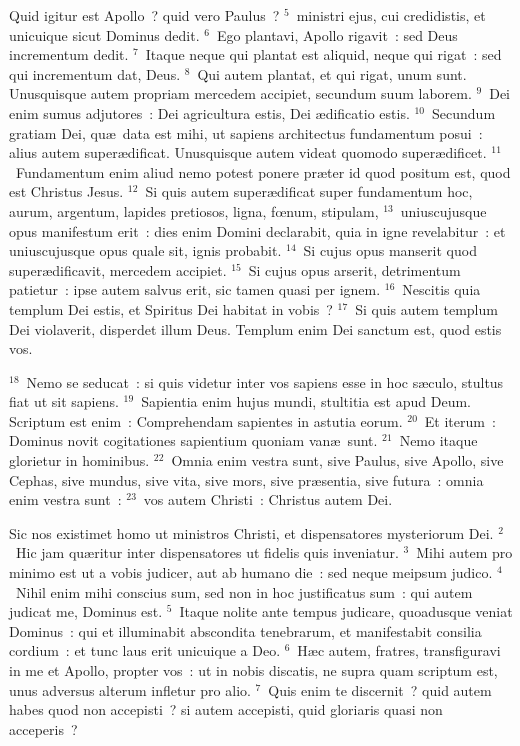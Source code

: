  Quid igitur est Apollo~? quid vero Paulus~?
${}^{5}$~ministri ejus, cui credidistis, et unicuique sicut Dominus dedit.
${}^{6}$~Ego plantavi, Apollo rigavit~: sed Deus incrementum dedit.
${}^{7}$~Itaque neque qui plantat est aliquid, neque qui rigat~: sed qui incrementum dat, Deus.
${}^{8}$~Qui autem plantat, et qui rigat, unum sunt. Unusquisque autem propriam mercedem accipiet, secundum suum laborem.
${}^{9}$~Dei enim sumus adjutores~: Dei agricultura estis, Dei \ae dificatio estis.
${}^{10}$~Secundum gratiam Dei, qu\ae\ data est mihi, ut sapiens architectus fundamentum posui~: alius autem super\ae dificat. Unusquisque autem videat quomodo super\ae dificet.
${}^{11}$~Fundamentum enim aliud nemo potest ponere pr\ae ter id quod positum est, quod est Christus Jesus.
${}^{12}$~Si quis autem super\ae dificat super fundamentum hoc, aurum, argentum, lapides pretiosos, ligna, fœnum, stipulam,
${}^{13}$~uniuscujusque opus manifestum erit~: dies enim Domini declarabit, quia in igne revelabitur~: et uniuscujusque opus quale sit, ignis probabit.
${}^{14}$~Si cujus opus manserit quod super\ae dificavit, mercedem accipiet.
${}^{15}$~Si cujus opus arserit, detrimentum patietur~: ipse autem salvus erit, sic tamen quasi per ignem.
${}^{16}$~Nescitis quia templum Dei estis, et Spiritus Dei habitat in vobis~?
${}^{17}$~Si quis autem templum Dei violaverit, disperdet illum Deus. Templum enim Dei sanctum est, quod estis vos.


${}^{18}$~Nemo se seducat~: si quis videtur inter vos sapiens esse in hoc s\ae culo, stultus fiat ut sit sapiens.
${}^{19}$~Sapientia enim hujus mundi, stultitia est apud Deum. Scriptum est enim~: Comprehendam sapientes in astutia eorum.
${}^{20}$~Et iterum~: Dominus novit cogitationes sapientium quoniam van\ae\ sunt.
${}^{21}$~Nemo itaque glorietur in hominibus.
${}^{22}$~Omnia enim vestra sunt, sive Paulus, sive Apollo, sive Cephas, sive mundus, sive vita, sive mors, sive pr\ae sentia, sive futura~: omnia enim vestra sunt~:
${}^{23}$~vos autem Christi~: Christus autem Dei.

\lettrine[lines=3,image=true,loversize=0.05,lraise=-0.03]{S}{}ic nos existimet homo ut ministros Christi, et dispensatores mysteriorum Dei.
${}^{2}$~Hic jam qu\ae ritur inter dispensatores ut fidelis quis inveniatur.
${}^{3}$~Mihi autem pro minimo est ut a vobis judicer, aut ab humano die~: sed neque meipsum judico.
${}^{4}$~Nihil enim mihi conscius sum, sed non in hoc justificatus sum~: qui autem judicat me, Dominus est.
${}^{5}$~Itaque nolite ante tempus judicare, quoadusque veniat Dominus~: qui et illuminabit abscondita tenebrarum, et manifestabit consilia cordium~: et tunc laus erit unicuique a Deo.
${}^{6}$~H\ae c autem, fratres, transfiguravi in me et Apollo, propter vos~: ut in nobis discatis, ne supra quam scriptum est, unus adversus alterum infletur pro alio.
${}^{7}$~Quis enim te discernit~? quid autem habes quod non accepisti~? si autem accepisti, quid gloriaris quasi non acceperis~?


